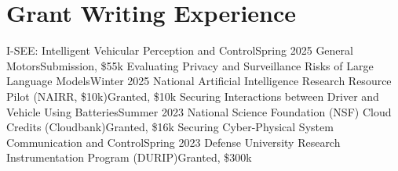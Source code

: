 \section{Grant Writing Experience}
  \CVSubHeadingListStart
    \CVSubheading
      {I-SEE: Intelligent Vehicular Perception and Control}{Spring 2025}
      {General Motors}{Submission, \$55k}
    \CVSubheading
      {Evaluating Privacy and Surveillance Risks of Large Language Models}{Winter 2025}
      {National Artificial Intelligence Research Resource Pilot (NAIRR, \$10k)}{Granted, \$10k}
    \CVSubheading
      {Securing Interactions between Driver and Vehicle Using Batteries}{Summer 2023}
      {National Science Foundation (NSF) Cloud Credits (Cloudbank)}{Granted, \$16k}
    \CVSubheading
      {Securing Cyber-Physical System Communication and Control}{Spring 2023}
      {Defense University Research Instrumentation Program (DURIP)}{Granted, \$300k}
  \CVSubHeadingListEnd